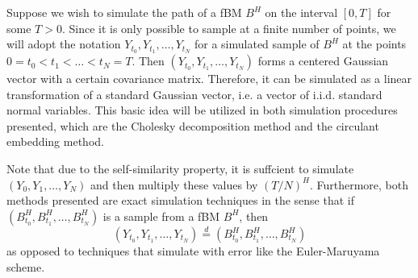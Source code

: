 Suppose we wish to simulate the path of a fBM $B^{H}$ on the interval $[0,T]$ for some $T>0$. Since it is only possible to sample at a finite number of points, we will adopt the notation $Y_{t_{0}},Y_{t_{1}},\dots,Y_{t_{N}}$ for a simulated sample of $B^H$ at the points $0=t_{0}<t_{1}<\dots<t_{N}=T$. Then $(Y_{t_{0}},Y_{t_{1}},\dots,Y_{t_{N}})$ forms a centered Gaussian vector with a certain covariance matrix. Therefore, it can be simulated as a linear transformation of a standard Gaussian vector, i.e. a vector of i.i.d. standard normal variables. This basic idea will be utilized in both simulation procedures presented, which are the Cholesky decomposition method and the circulant embedding method. 

Note that due to the self-similarity property, it is suffcient to simulate $(Y_{0},Y_{1},\dots, Y_{N})$ and then multiply these values by $(T/N)^H$. Furthermore, both methods presented are exact simulation techniques in the sense that if $(B_{t_{0}}^{H},B_{t_{1}}^{H},\dots, B_{t_{N}}^{H})$ is a sample from a fBM $B^H$, then 
\begin{equation}
    (Y_{t_{0}},Y_{t_{1}},\dots,Y_{t_{N}}) \overset{d}{=}(B_{t_{0}}^{H},B_{t_{1}}^{H},\dots, B_{t_{N}}^{H})
\end{equation}
as opposed to techniques that simulate with error like the Euler-Maruyama scheme.

